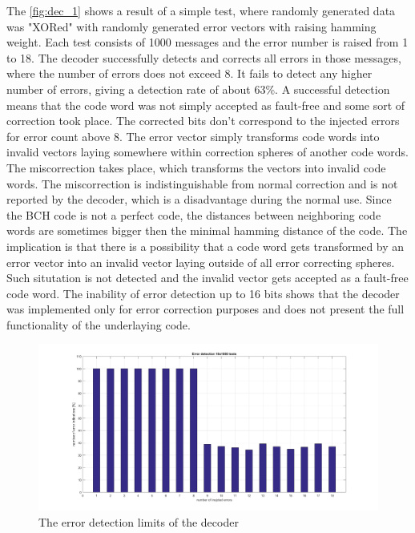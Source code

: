The \autoref{fig:dec_1} shows a result of a simple test, where randomly generated data was "XORed" with randomly generated error vectors with raising hamming weight. Each test consists of 1000 messages and the error number is raised from 1 to 18. The decoder successfully detects and corrects all errors in those messages, where the number of errors does not exceed 8. It fails to detect any higher number of errors, giving a detection rate of about 63\%. A successful detection means that the code word was not simply accepted as fault-free and some sort of correction took place. The corrected bits don't correspond to the injected errors for error count above 8. The error vector simply transforms code words into invalid vectors laying somewhere within correction spheres of another code words. The miscorrection takes place, which transforms the vectors into invalid code words. The miscorrection is indistinguishable from normal correction and is not reported by the decoder, which is a disadvantage during the normal use. Since the BCH code is not a perfect code, the distances between neighboring code words are sometimes bigger then the minimal hamming distance of the code. The implication is that there is a possibility that a code word gets transformed by an error vector into an invalid vector laying outside of all error correcting spheres. Such situtation is not detected and the invalid vector gets accepted as a fault-free code word. The inability of error detection up to 16 bits shows that the decoder was implemented only for error correction purposes and does not present the full functionality of the underlaying code.

\begin{figure}[h]
\centering
\includegraphics[width=\textwidth]{figures/1000_tests_error_detection.png}
\caption{The error detection limits of the decoder}
\label{fig:dec_1}
\end{figure}

